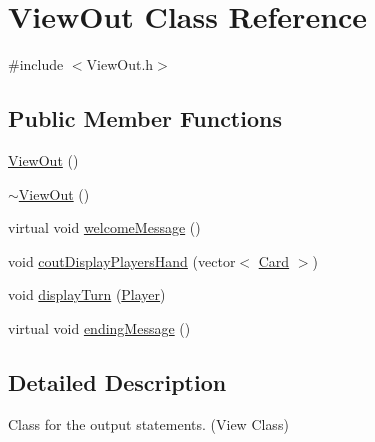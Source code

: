 \hypertarget{class_view_out}{\section{View\-Out Class Reference}
\label{class_view_out}
}


{\ttfamily \#include $<$View\-Out.\-h$>$}

\subsection*{Public Member Functions}
\begin{DoxyCompactItemize}
\item 
\hyperlink{class_view_out_a14f3add702732074db9384a4c83f1e52}{View\-Out} ()
\item 
\hyperlink{class_view_out_a8849b000eaa67af379c8257622107b67}{$\sim$\-View\-Out} ()
\item 
virtual void \hyperlink{class_view_out_a4689f97048cd61ab7df83a3158d03ee7}{welcome\-Message} ()
\item 
void \hyperlink{class_view_out_aa284dd2c46946728bfbeb61f79bdbc1c}{cout\-Display\-Players\-Hand} (vector$<$ \hyperlink{class_card}{Card} $>$)
\item 
void \hyperlink{class_view_out_adc9f94c7824bbaf97193cf51a06088dc}{display\-Turn} (\hyperlink{class_player}{Player})
\item 
virtual void \hyperlink{class_view_out_a6b8f759a8a7a05ed0f271ee564258f9e}{ending\-Message} ()
\end{DoxyCompactItemize}


\subsection{Detailed Description}
Class for the output statements. (View Class) 


